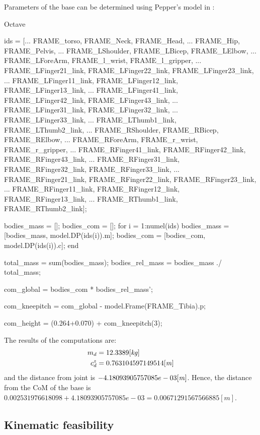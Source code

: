 Parameters of the base can be determined using Pepper's model in :
%
\begin{listingtcb}{Octave}
\begin{deflisting}
ids = [...
FRAME_torso, FRAME_Neck, FRAME_Head, ...
FRAME_Hip, FRAME_Pelvis, ...
FRAME_LShoulder, FRAME_LBicep, FRAME_LElbow, ...
FRAME_LForeArm, FRAME_l_wrist, FRAME_l_gripper, ...
FRAME_LFinger21_link, FRAME_LFinger22_link, FRAME_LFinger23_link, ...
FRAME_LFinger11_link, FRAME_LFinger12_link, FRAME_LFinger13_link, ...
FRAME_LFinger41_link, FRAME_LFinger42_link, FRAME_LFinger43_link, ...
FRAME_LFinger31_link, FRAME_LFinger32_link, ...
FRAME_LFinger33_link, ...
FRAME_LThumb1_link, FRAME_LThumb2_link, ...
FRAME_RShoulder, FRAME_RBicep, FRAME_RElbow, ...
FRAME_RForeArm, FRAME_r_wrist, FRAME_r_gripper, ...
FRAME_RFinger41_link, FRAME_RFinger42_link, FRAME_RFinger43_link, ...
FRAME_RFinger31_link, FRAME_RFinger32_link, FRAME_RFinger33_link, ...
FRAME_RFinger21_link, FRAME_RFinger22_link, FRAME_RFinger23_link, ...
FRAME_RFinger11_link, FRAME_RFinger12_link, FRAME_RFinger13_link, ...
FRAME_RThumb1_link, FRAME_RThumb2_link];


bodies_mass = [];
bodies_com  = [];
for i = 1:numel(ids)
    bodies_mass = [bodies_mass, model.DP(ids(i)).m];
    bodies_com = [bodies_com, model.DP(ids(i)).c];
end

total_mass = sum(bodies_mass);
bodies_rel_mass = bodies_mass ./ total_mass;

com_global = bodies_com * bodies_rel_mass';

com_kneepitch = com_global - model.Frame(FRAME_Tibia).p;

com_height = (0.264+0.070) + com_kneepitch(3);
\end{deflisting}
\end{listingtcb}

The results of the computations are:
%
\begin{align}
    m_{d}       &=  12.3389 \mathit{[kg]}\\
    c_{d}^{z}   &=  0.763104597149514 \mathit{[m]}
\end{align}
%
and the distance from  joint is $-4.18093905757085e-03
\mathit{[m]}$. Hence, the distance from the CoM of the base is $0.002531976618098 +
4.18093905757085e-03 = 0.00671291567566885 [m]$.



\subsection{Kinematic feasibility}

